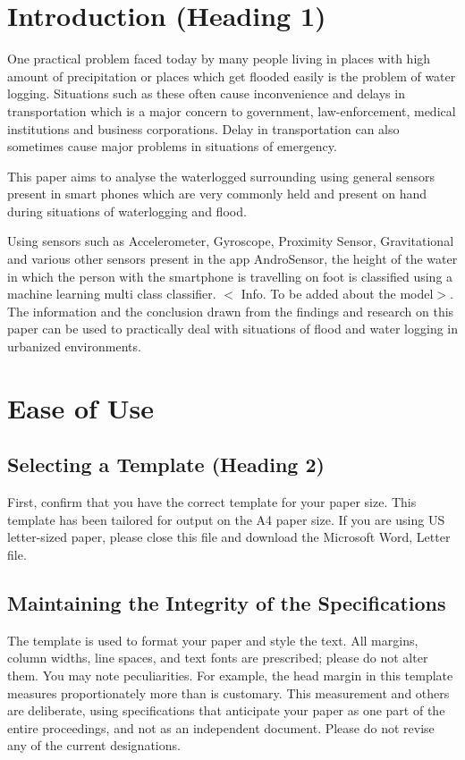 \documentclass{article} %
\begin{document}
\section{ Introduction (Heading 1)}

One practical problem faced today by many people living in places with high amount of precipitation or places which get flooded easily is the problem of water logging. Situations such as these often cause inconvenience and delays in transportation which is a major concern to government, law-enforcement, medical institutions and business corporations. Delay in transportation can also sometimes cause major problems in situations of emergency.

\noindent This paper aims to analyse the waterlogged surrounding using general sensors present in smart phones which are very commonly held and present on hand during situations of waterlogging and flood.

Using sensors such as Accelerometer, Gyroscope, Proximity Sensor, Gravitational and various other sensors present in the app AndroSensor, the height of the water in which the person with the smartphone is travelling on foot is classified using a machine learning multi class classifier. $\mathrm{<}$ Info. To be added about the model$\mathrm{>}$. The information and the conclusion drawn from the findings and research on this paper can be used to practically deal with situations of flood and water logging in urbanized environments.


\section{ Ease of Use}


\subsection{ Selecting a Template (Heading 2)}

First, confirm that you have the correct template for your paper size. This template has been tailored for output on the A4 paper size. If you are using US letter-sized paper, please close this file and download the Microsoft Word, Letter file.


\subsection{ Maintaining the Integrity of the Specifications}

The template is used to format your paper and style the text. All margins, column widths, line spaces, and text fonts are prescribed; please do not alter them. You may note peculiarities. For example, the head margin in this template measures proportionately more than is customary. This measurement and others are deliberate, using specifications that anticipate your paper as one part of the entire proceedings, and not as an independent document. Please do not revise any of the current designations.
\end{document}
